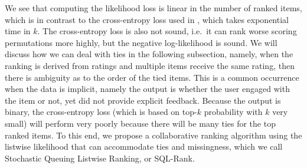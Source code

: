 \documentclass{article}
\begin{document}
We see that computing the likelihood loss is linear in the number of ranked items, which is in contrast to the cross-entropy loss used in \cite{cao2007learning}, which takes exponential time in $k$.
The cross-entropy loss is also not sound, i.e.~it can rank worse scoring permutations more highly, but the 
negative log-likelihood is sound.
We will discuss how we can deal with ties in the following subsection, namely, when the ranking is derived from ratings and multiple items receive the same rating, then there is ambiguity as to the order of the tied items.
This is a common occurrence when the data is implicit, namely the output is whether the user engaged with the item or not, yet did not provide explicit feedback.
Because the output is binary, the cross-entropy loss (which is based on top-$k$ probability with $k$ very small) will perform very poorly because there will be many ties for the top ranked items.
To this end, we propose a collaborative ranking algorithm using the listwise likelihood that can accommodate ties and missingness, which we call Stochastic Queuing Listwise Ranking, or SQL-Rank.



\end{document}
